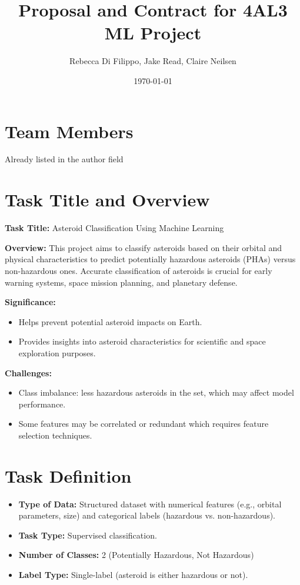 \documentclass{article}
\title{Proposal and Contract for 4AL3 ML Project}
\author{Rebecca Di Filippo, Jake Read, Claire Neilsen}
\date{\today}
\begin{document}
\maketitle

\section{Team Members}
\raggedright Already listed in the author field

\section{Task Title and Overview}
\textbf{Task Title:} Asteroid Classification Using Machine Learning

\textbf{Overview:} 
This project aims to classify asteroids based on their orbital and physical characteristics to predict potentially hazardous asteroids (PHAs) versus non-hazardous ones. 
Accurate classification of asteroids is crucial for early warning systems, space mission planning, and planetary defense.

\textbf{Significance:}
\begin{itemize}
    \item Helps prevent potential asteroid impacts on Earth.
    \item Provides insights into asteroid characteristics for scientific and space exploration purposes.
\end{itemize}

\textbf{Challenges:}
\begin{itemize}
    \item Class imbalance: less hazardous asteroids in the set, which may affect model performance.
    \item Some features may be correlated or redundant which requires feature selection techniques.
\end{itemize}

\section{Task Definition}
\begin{itemize}
    \item \textbf{Type of Data:} Structured dataset with numerical features (e.g., orbital parameters, size) and categorical labels (hazardous vs. non-hazardous).
    \item \textbf{Task Type:} Supervised classification.
    \item \textbf{Number of Classes:} 2 (Potentially Hazardous, Not Hazardous)
    \item \textbf{Label Type:} Single-label (asteroid is either hazardous or not).
\end{itemize}
\end{document}
